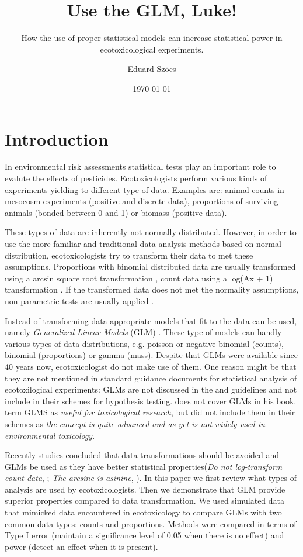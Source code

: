 \documentclass{scrartcl}\usepackage[]{graphicx}\usepackage[]{color}
\title{Use the GLM, Luke!}
\subtitle{How the use of proper statistical models can increase statistical power in ecotoxicological experiments.}
\author{Eduard Szöcs}
\date{\today}
\begin{document}
\maketitle

\section{Introduction}

In environmental risk assessments statistical tests play an important role to evalute the effects of pesticides.
Ecotoxicologists perform various kinds of experiments yielding to different type of data.
Examples are: animal counts in mesocosm experiments (positive and discrete data), 
proportions of surviving animals (bonded between 0 and 1) or biomass (positive data).

These types of data are inherently not normally distributed. 
However, in order to use the more familiar and traditional data analysis methods based on normal distribution, ecotoxicologists try to transform their data to met these assumptions. 
Proportions with binomial distributed data are usually transformed using a arcsin square root transformation \citep{oecd_current_2006,
newman_quantitative_2012},
count data using a log(Ax + 1) transformation \citep{van_den_brink_impact_2000}.
If the transformed data does not met the normality assumptions, non-parametric tests are usually applied \citep{wang_making_2011}.

Instead of transforming data appropriate models that fit to the data can be used, namely \emph{Generalized Linear Models} (GLM) \citep{nelder_generalized_1972}. These type of models can handly various types of data distributions, e.g. poisson or negative binomial (counts), binomial (proportions) or gamma (mass).
Despite that GLMs were available since 40 years now, ecotoxicologist do not make use of them.
One reason might be that they are not mentioned in standard guidance documents for statistical analysis of ecotoxilogical experiments:
GLMs are not discussed in the \citep{oecd_current_2006} and \citep{epa_methods_2002} guidelines and  not include in their schemes for hypothesis testing. 
\citet{newman_quantitative_2012} does not cover GLMs in his book.
\citet{environment_canada_guidance_2005} term GLMS as \emph{useful for toxicological research}, but did not include them in their schemes as \emph{the concept is quite advanced and as yet is not widely used in environmental toxicology}.

Recently studies concluded that data transformations should be avoided and GLMs be used as they have better statistical properties(\emph{Do not log-transform count data}, \citep{ohara_not_2010}; \emph{The arcsine is asinine}, \citep{warton_arcsine_2011}).
In this paper we first review what types of analysis are used by ecotoxicologists.
Then we demonstrate that GLM provide superior properties compared to data transformation. 
We used simulated data that mimicked data encountered in ecotoxicology to compare GLMs with two common data types: counts and proportions. 
Methods were compared in terms of Type I error (maintain a significance level of 0.05 when there is no effect) and power (detect an effect when it is present). 
\end{document}

